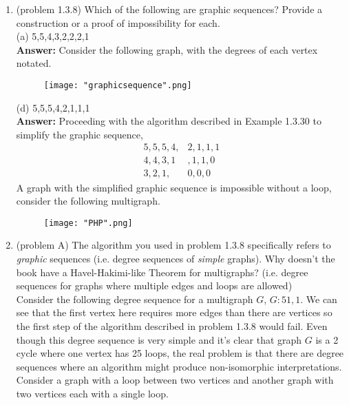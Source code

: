 \documentclass{amsart}
\begin{document}
\thispagestyle{fancy}
 
\begin{enumerate}
\item (problem 1.3.8) Which of the following are graphic sequences? Provide a construction or a proof of impossibility for each.\\

(a) 5,5,4,3,2,2,2,1\\

\textbf{Answer:} Consider the following graph, with the degrees of each vertex notated.\\
\begin{figure}[H]
\centering
\texttt{[image: "graphicsequence".png]}
\end{figure}
\vspace{.5in}

(d) 5,5,5,4,2,1,1,1\\


\textbf{Answer:} Proceeding with the algorithm described in Example 1.3.30 to simplify the graphic sequence,
\begin{align*}
5,5,5,4,&2,1,1,1\\
4,4,3,1&,1,1,0\\
3,2,1,&0,0,0
\end{align*}
A graph with the simplified graphic sequence is impossible without a loop, consider the following multigraph.

\begin{figure}[H]
\centering
\texttt{[image: "PHP".png]}
\end{figure}


\vspace{.5in}

\item (problem A) The algorithm you used in problem 1.3.8 specifically refers to \emph{graphic} sequences (i.e. degree sequences of \emph{simple} graphs). Why doesn't the book have a Havel-Hakimi-like Theorem for multigraphs? (i.e. degree sequences for graphs where multiple edges and loops are allowed)\\

Consider the following degree sequence for a multigraph $G$, $G: 51,1$. We can see that the first vertex here requires more edges than there are vertices so the first step of the algorithm described in problem 1.3.8 would fail. Even though this degree sequence is very simple and it's clear that graph $G$ is a 2 cycle where one vertex has 25 loops, the real problem is that there are degree sequences where an algorithm might produce non-isomorphic interpretations. Consider a graph with a loop between two vertices and another graph with two vertices each with a single loop.







\end{enumerate}
\end{document}
